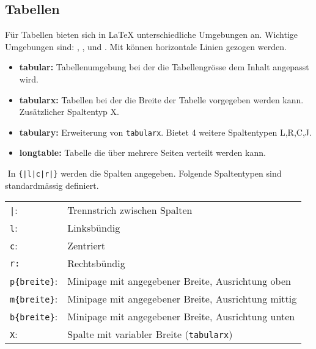\subsection{Tabellen}
Für Tabellen bieten sich in \LaTeX{} unterschiedliche Umgebungen an. Wichtige Umgebungen sind: , ,  und . Mit  können horizontale Linien gezogen werden.
\begin{itemize}
	\item \textbf{tabular:} Tabellenumgebung bei der die Tabellengrösse dem Inhalt angepasst wird. 
	\item \textbf{tabularx:} Tabellen bei der die Breite der Tabelle vorgegeben werden kann. Zusätzlicher Spaltentyp X.
	\item \textbf{tabulary:} Erweiterung von \texttt{tabularx}. Bietet 4 weitere Spaltentypen L,R,C,J.
	\item \textbf{longtable:} Tabelle die über mehrere Seiten verteilt werden kann.
\end{itemize}
$ $\vspace{-12pt}
In \texttt{\{|l|c|r|\}} werden die Spalten angegeben. Folgende Spaltentypen sind standardmässig definiert.\\ 
\begin{tabular}{l l}
	\texttt{|}: & Trennstrich zwischen Spalten\\
 	\texttt{l}: & Linksbündig \\
	\texttt{c}: & Zentriert\\
	\texttt{r:} & Rechtsbündig\\
	\texttt{p\{breite\}}: & Minipage mit angegebener Breite, Ausrichtung oben\\
	\texttt{m\{breite\}}: & Minipage mit angegebener Breite, Ausrichtung mittig\\
	\texttt{b\{breite\}}: & Minipage mit angegebener Breite, Ausrichtung unten\\
	\texttt{X}: & Spalte mit variabler Breite (\texttt{tabularx})\\
\end{tabular}\clearpage
%  

